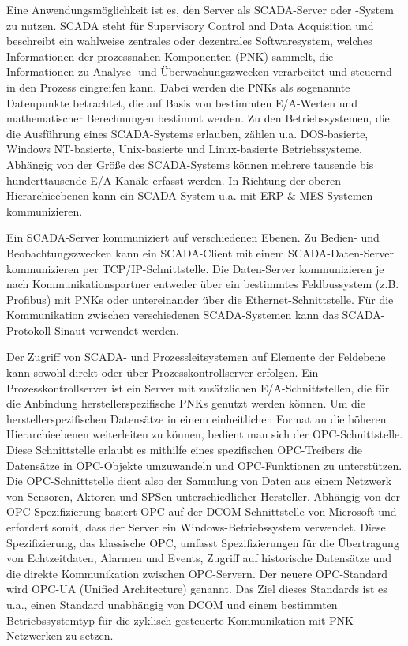 Eine Anwendungsmöglichkeit ist es, den Server als SCADA-Server oder -System zu nutzen. SCADA steht für Supervisory Control and Data Acquisition und beschreibt ein wahlweise zentrales oder dezentrales Softwaresystem, welches Informationen der prozessnahen Komponenten (PNK) sammelt, die Informationen zu Analyse- und Überwachungszwecken verarbeitet und steuernd in den Prozess eingreifen kann. Dabei werden die PNKs als sogenannte Datenpunkte betrachtet, die auf Basis von bestimmten E/A-Werten und mathematischer Berechnungen bestimmt werden. 
Zu den Betriebssystemen, die die Ausführung eines SCADA-Systems erlauben, zählen u.a. DOS-basierte, Windows NT-basierte, Unix-basierte und Linux-basierte Betriebssysteme. Abhängig von der Größe des SCADA-Systems können mehrere tausende bis hunderttausende E/A-Kanäle erfasst werden\citep{SCADA2}. 
In Richtung der oberen Hierarchieebenen kann ein SCADA-System u.a. mit ERP \& MES Systemen kommunizieren\citep{SCADA3}.

Ein SCADA-Server kommuniziert auf verschiedenen Ebenen. Zu Bedien- und Beobachtungszwecken kann ein SCADA-Client mit einem SCADA-Daten-Server kommunizieren per TCP/IP-Schnittstelle. Die Daten-Server kommunizieren je nach Kommunikationspartner entweder über ein bestimmtes Feldbussystem (z.B. Profibus) mit PNKs oder untereinander über die Ethernet-Schnittstelle. Für die Kommunikation zwischen verschiedenen SCADA-Systemen kann das SCADA-Protokoll \glqq Sinaut\grqq{} verwendet werden\citep{SCADA2}.


Der Zugriff von SCADA- und Prozessleitsystemen auf Elemente der Feldebene kann sowohl direkt oder über Prozesskontrollserver erfolgen. Ein Prozesskontrollserver ist ein Server mit zusätzlichen E/A-Schnittstellen, die für die Anbindung herstellerspezifische PNKs genutzt werden können. Um die herstellerspezifischen Datensätze in einem einheitlichen Format an die höheren Hierarchieebenen weiterleiten zu können, bedient man sich der OPC-Schnittstelle. Diese Schnittstelle erlaubt es mithilfe eines spezifischen OPC-Treibers die Datensätze in OPC-Objekte umzuwandeln und OPC-Funktionen zu unterstützen. Die OPC-Schnittstelle dient also der Sammlung von Daten aus einem Netzwerk von Sensoren, Aktoren und SPSen unterschiedlicher Hersteller. 
Abhängig von der OPC-Spezifizierung basiert OPC auf der DCOM-Schnittstelle von Microsoft und erfordert somit, dass der Server ein Windows-Betriebssystem verwendet. Diese Spezifizierung, das klassische OPC, umfasst Spezifizierungen für die Übertragung von Echtzeitdaten, Alarmen und Events, Zugriff auf historische Datensätze und die direkte Kommunikation zwischen OPC-Servern.
Der neuere OPC-Standard wird OPC-UA (Unified Architecture) genannt. Das Ziel dieses Standards ist es u.a., einen Standard unabhängig von DCOM und einem bestimmten Betriebssystemtyp für die zyklisch gesteuerte Kommunikation mit PNK-Netzwerken zu setzen.\\


